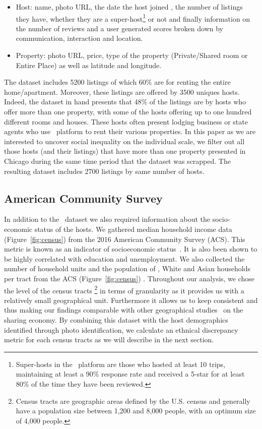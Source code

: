 \begin{itemize}
\item Host:  name, photo URL, the date the host joined \ab, the number of listings they have, whether they are a super-host\footnote{Super-hosts in the \ab \ platform are those who hosted at least 10 trips, maintaining at least a 90\%  response rate and received  a 5-star for  at least 80\% of the time they have been reviewed.} or not and finally information on the number of reviews and a user generated scores broken down by communication, interaction and location.

\item{Property}:  photo URL,  price, type of the property (Private/Shared room or Entire Place) as well as  latitude and longitude. 

\end{itemize}

The dataset includes 5200 listings of which 60\% are for renting the entire home/apartment. Moreover, these listings are offered by 3500 uniques hosts. Indeed, the dataset in hand presents that 48\% of the listings are by hosts who offer more than one property, with some of the hosts offering up to one hundred different rooms and houses. These hosts often present lodging business or state agents who use \ab \ platform to rent their various properties.  In this paper as we are interested to uncover social inequality on the individual scale, we filter out all those hosts (and their listings) that have more than one property presented in Chicago during the same time period that the dataset was scrapped. The resulting dataset includes 2700 listings by same number of hosts. 
 
 
\subsection{American Community Survey}
In addition to the \ab \ dataset we also required information about the socio-economic status of the hosts. We gathered median household income data (Figure~\ref{fig:census}) from the 2016  American Community Survey (ACS). This metric is known as an indicator of socioeconomic status~\cite{li2013spatial}. It is also been shown to be highly correlated with education and unemployment. We also collected the number of household units and the population of \aam, White and Asian households per tract from the ACS (Figure~\ref{fig:census}) .  Throughout our analysis, we chose the level of the census tracts \footnote{Census tracts are geographic areas defined by the U.S. census and generally have a population size between 1,200 and 8,000 people, with an optimum size of 4,000 people.} in terms of granularity as it provides us with a relatively small geographical unit.  Furthermore it allows us to  keep consistent and thus making our findings comparable with other  geographical studies~\cite{Thebault-Spieker17} on the sharing economy.  By combining this dataset with the host demographics identified through photo identification, we calculate an ethnical discrepancy metric for each census tracts as we will describe in the next section. 
 
